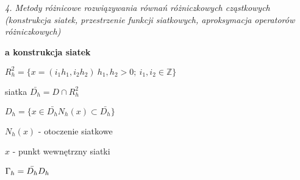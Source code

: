\textit{4. Metody różnicowe rozwiązywania równań różniczkowych cząstkowych (konstrukcja siatek, przestrzenie funkcji siatkowych, aproksymacja operatorów różniczkowych)}

\textbf{a\) konstrukcja siatek}

$R^{2}_{h} = \{ x = (i_{1}h_{1}, i_{2}h_{2})\ h_{1},h_{2} > 0;\ i_{1},i_{2} \in \mathbb{Z}\}$

siatka $\bar{D_{h}} = D \cap R^{2}_{h}$

$D_{h} = \{ x \in \bar{D_{h}} N_h(x) \subset \bar{D_{h}}\}$

$N_h(x)$ - otoczenie siatkowe

$x$ - punkt wewnętrzny siatki

$\Gamma_h = \bar{D_h} \\ D_h$